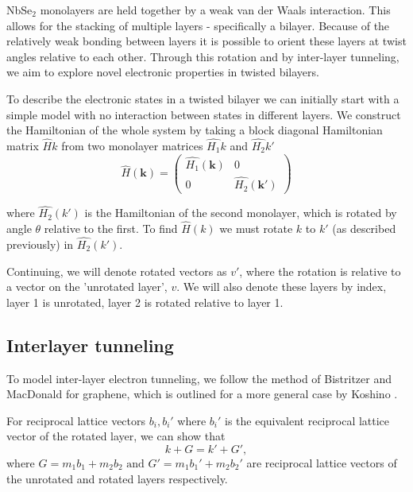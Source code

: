 \documentclass[12pt]{report} %
\begin{document}
  NbSe$_2$ monolayers are held together by a weak van der Waals interaction. This allows for the stacking of multiple layers - specifically a bilayer. Because of the relatively weak bonding between layers it is possible to orient these layers at twist angles relative to each other. Through this rotation and by inter-layer tunneling, we aim to explore novel electronic properties in twisted bilayers.

  To describe the electronic states in a twisted bilayer we can initially start with a simple model with no interaction between states in different layers. We construct the Hamiltonian of the whole system by taking a block diagonal Hamiltonian matrix $\hat{H}{k}$ from two monolayer matrices $\hat{H_1}{k}$ and $\hat{H_2}{k'}$
%
      \begin{equation}
        \hat{H}(\boldsymbol{k})=\left(\begin{array}{cc}
          \hat{H_1}(\boldsymbol{k}) & 0\\
          0 & \hat{H_2}(\boldsymbol{k'})
        \end{array}\right)
        \label{simple_bilayer_hamiltonian}
      \end{equation}
      
  where $\hat{H_2}(k')$ is the Hamiltonian of the second monolayer, which is rotated by angle $\theta$ relative to the first. To find $\hat{H}(k)$ we must rotate $k$ to $k'$ (as described previously) in $\hat{H_2}(k')$.

  Continuing, we will denote rotated vectors as $v'$, where the rotation is relative to a vector on the 'unrotated layer', $v$. We will also denote these layers by index, layer 1 is unrotated, layer 2 is rotated relative to layer 1.

\subsection*{Interlayer tunneling}
  To model inter-layer electron tunneling, we follow the method of Bistritzer and MacDonald \cite{Bistritzer2011} for graphene, which is outlined for a more general case by Koshino \cite{Koshino2015}.

  For reciprocal lattice vectors $b_i, b_i'$ where $b_i'$ is the equivalent reciprocal lattice vector of the rotated layer, we can show that
  \begin{equation}
    k + G = k' + G',
    \label{inter-layer_k_plus_G}
  \end{equation}
  where $G = m_1 b_1 + m_2 b_2 \text{ and } G' = m_1 b_1' + m_2 b_2'$ are reciprocal lattice vectors of the unrotated and rotated layers respectively.
\end{document}
